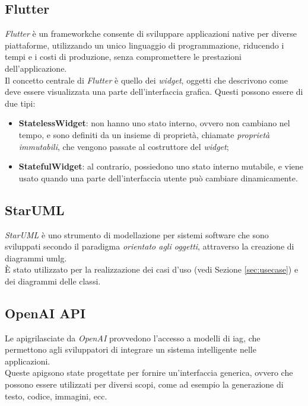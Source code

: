 \subsection*{Flutter}
\label{subsec:flutter}

\emph{Flutter} \cite{site:flutter} è un \gls{framework}\glsoccur che consente di sviluppare applicazioni native per diverse piattaforme, utilizzando un unico linguaggio di programmazione, riducendo i tempi e i costi di produzione, senza compromettere le prestazioni dell'applicazione.\\
Il concetto centrale di \emph{Flutter} è quello dei \emph{widget}, oggetti che descrivono come deve essere visualizzata una parte dell'interfaccia grafica. Questi possono essere di due tipi:
\begin{itemize}
    \item \textbf{StatelessWidget}: non hanno uno stato interno, ovvero non cambiano nel tempo, e sono definiti da un insieme di proprietà, chiamate \emph{proprietà immutabili}, che vengono passate al costruttore del \emph{widget};
    \item \textbf{StatefulWidget}: al contrario, possiedono uno stato interno mutabile, e viene usato quando una parte dell'interfaccia utente può cambiare dinamicamente.
\end{itemize}

\subsection*{StarUML}
\label{subsec:staruml}

\emph{StarUML} \cite{site:staruml} è uno strumento di modellazione per sistemi software che sono sviluppati secondo il paradigma \emph{orientato agli oggetti}, attraverso la creazione di diagrammi \gls{umlg}\glsoccur.\\
È stato utilizzato per la realizzazione dei casi d'uso (vedi Sezione \ref{sec:usecase}) e dei diagrammi delle classi.

\subsection*{OpenAI API}
\label{subsec:openai-api}

Le \gls{apig}\glsoccur rilasciate da \emph{OpenAI} \cite{site:openai} provvedono l'accesso a modelli di \gls{iag}\glsoccur, che permettono agli sviluppatori di integrare un sistema intelligente nelle applicazioni.\\ 
Queste \gls{apig}\glsoccur sono state progettate per fornire un'interfaccia generica, ovvero che possono essere utilizzati per diversi scopi, come ad esempio la generazione di testo, codice, immagini, ecc.\\

